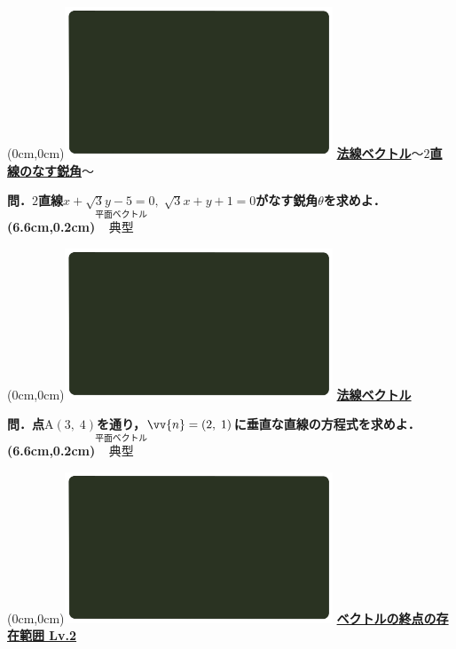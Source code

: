 \documentclass[10pt,
fleqn,
dvipdfmx,
uplatex
]{jsarticle}
\begin{document}
\newpage



\at(0cm,0cm){\includegraphics[width=8cm,bb=0 0 1920 1080]{./youtube/thumbnails/templates/smart_background/平面ベクトル.jpeg}}
{\color{orange}\bf\boldmath\large\underline{法線ベクトル$〜2$直線のなす鋭角$〜$}}\vspace{0.3zw}

\LARGE 
\bf\boldmath 問．$2$直線$x+\sqrt 3y-5=0,\;\sqrt 3x+y+1=0$がなす鋭角$\theta$を求めよ．
\at(6.6cm,0.2cm){\small\color{bradorange}$\overset{\text{平面ベクトル}}{\text{典型}}$}


\newpage



\at(0cm,0cm){\includegraphics[width=8cm,bb=0 0 1920 1080]{./youtube/thumbnails/templates/smart_background/平面ベクトル.jpeg}}
{\color{orange}\bf\boldmath\huge\underline{法線ベクトル}}\vspace{0.3zw}

\LARGE 
\bf\boldmath 問．点$\text{A}\left(3,\;4\right)$を通り，$\vv{n}=\left(2,\;1\right)$に垂直な直線の方程式を求めよ．
\at(6.6cm,0.2cm){\small\color{bradorange}$\overset{\text{平面ベクトル}}{\text{典型}}$}


\newpage



\at(0cm,0cm){\includegraphics[width=8cm,bb=0 0 1920 1080]{./youtube/thumbnails/templates/smart_background/平面ベクトル.jpeg}}
{\color{orange}\bf\boldmath\large\underline{ベクトルの終点の存在範囲 Lv.2 }}\vspace{0.3zw}
\end{document}
